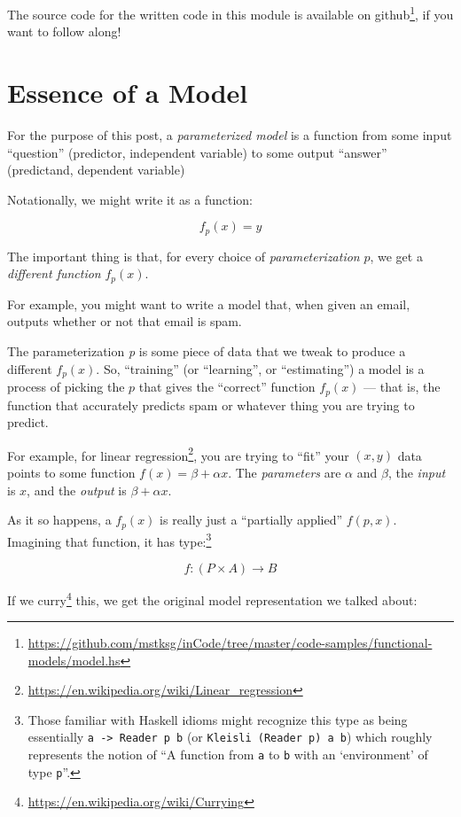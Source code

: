 \documentclass[]{article}
\renewcommand{\href}[2]{#2\footnote{\url{#1}}}
\begin{document}
The source code for the written code in this module is available
\href{https://github.com/mstksg/inCode/tree/master/code-samples/functional-models/model.hs}{on
github}, if you want to follow along!

\hypertarget{essence-of-a-model}{%
\section{Essence of a Model}\label{essence-of-a-model}}

For the purpose of this post, a \emph{parameterized model} is a function from
some input ``question'' (predictor, independent variable) to some output
``answer'' (predictand, dependent variable)

Notationally, we might write it as a function:

\[
f_p(x) = y
\]

The important thing is that, for every choice of \emph{parameterization} \(p\),
we get a \emph{different function} \(f_p(x)\).

For example, you might want to write a model that, when given an email, outputs
whether or not that email is spam.

The parameterization \emph{p} is some piece of data that we tweak to produce a
different \(f_p(x)\). So, ``training'' (or ``learning'', or ``estimating'') a
model is a process of picking the \(p\) that gives the ``correct'' function
\(f_p(x)\) --- that is, the function that accurately predicts spam or whatever
thing you are trying to predict.

For example, for \href{https://en.wikipedia.org/wiki/Linear_regression}{linear
regression}, you are trying to ``fit'' your \((x, y)\) data points to some
function \(f(x) = \beta + \alpha x\). The \emph{parameters} are \(\alpha\) and
\(\beta\), the \emph{input} is \(x\), and the \emph{output} is
\(\beta + \alpha x\).

As it so happens, a \(f_p(x)\) is really just a ``partially applied''
\(f(p,x)\). Imagining that function, it has type:\footnote{Those familiar with
  Haskell idioms might recognize this type as being essentially
  \texttt{a\ -\textgreater{}\ Reader\ p\ b} (or
  \texttt{Kleisli\ (Reader\ p)\ a\ b}) which roughly represents the notion of
  ``A function from \texttt{a} to \texttt{b} with an `environment' of type
  \texttt{p}''.}

\[
f : (P \times A) \rightarrow B
\]

If we \href{https://en.wikipedia.org/wiki/Currying}{curry} this, we get the
original model representation we talked about:
\end{document}
